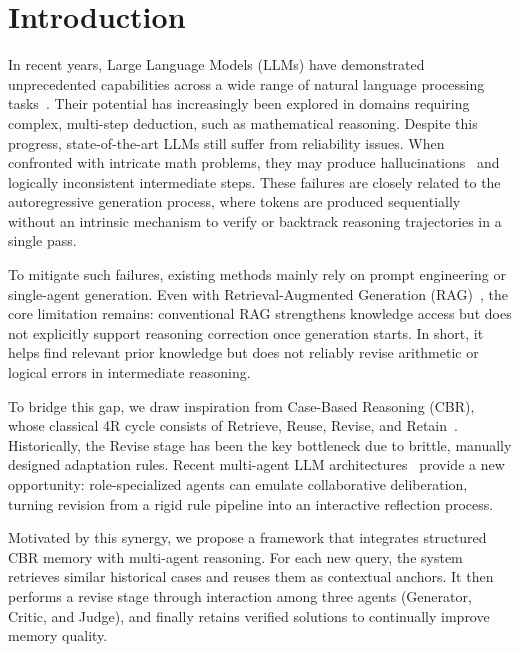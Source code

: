 \section{Introduction}

In recent years, Large Language Models (LLMs) have demonstrated unprecedented capabilities across a wide range of natural language processing tasks~\cite{zhao2023survey}. Their potential has increasingly been explored in domains requiring complex, multi-step deduction, such as mathematical reasoning. Despite this progress, state-of-the-art LLMs still suffer from reliability issues. When confronted with intricate math problems, they may produce hallucinations~\cite{ji2023hallucination} and logically inconsistent intermediate steps. These failures are closely related to the autoregressive generation process, where tokens are produced sequentially without an intrinsic mechanism to verify or backtrack reasoning trajectories in a single pass.

To mitigate such failures, existing methods mainly rely on prompt engineering or single-agent generation. Even with Retrieval-Augmented Generation (RAG)~\cite{lewis2020rag}, the core limitation remains: conventional RAG strengthens knowledge access but does not explicitly support reasoning correction once generation starts. In short, it helps find relevant prior knowledge but does not reliably revise arithmetic or logical errors in intermediate reasoning.

To bridge this gap, we draw inspiration from Case-Based Reasoning (CBR), whose classical 4R cycle consists of Retrieve, Reuse, Revise, and Retain~\cite{aamodt1994cbr}. Historically, the Revise stage has been the key bottleneck due to brittle, manually designed adaptation rules. Recent multi-agent LLM architectures~\cite{wu2023autogen} provide a new opportunity: role-specialized agents can emulate collaborative deliberation, turning revision from a rigid rule pipeline into an interactive reflection process.

Motivated by this synergy, we propose a framework that integrates structured CBR memory with multi-agent reasoning. For each new query, the system retrieves similar historical cases and reuses them as contextual anchors. It then performs a revise stage through interaction among three agents (Generator, Critic, and Judge), and finally retains verified solutions to continually improve memory quality.

